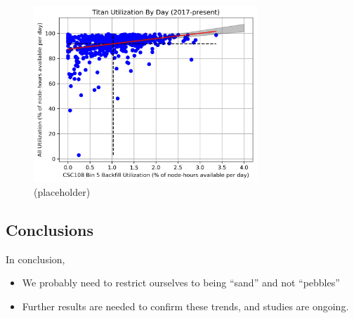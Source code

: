 \begin{figure}
  \includegraphics[width=0.75\textwidth]{images/linfit-utilization-by-true-day-bin5.png}
\caption{(placeholder)}
\label{fig:utilization-bin5}
\end{figure}


\subsection{Conclusions}
\label{subsec:sec4-conclusions}

In conclusion,
\begin{itemize}
    \item We probably need to restrict ourselves to being ``sand'' and not
        ``pebbles''
    \item Further results are needed to confirm these trends, and studies are
        ongoing.
\end{itemize}


